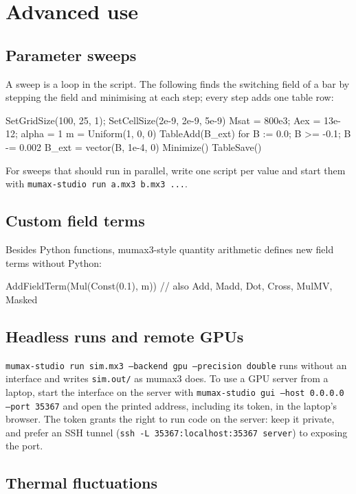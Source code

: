 \documentclass[11pt,a4paper,oneside]{book}
\newcommand{\code}[1]{\texttt{#1}}
\renewcommand{\_}{\textunderscore\allowbreak}
\begin{document}
\chapter{Advanced use}\label{ch:advanced}

\section{Parameter sweeps}

A sweep is a loop in the script. The following finds the switching field of a bar by stepping the field and
minimising at each step; every step adds one table row:
\begin{mxcode}
SetGridSize(100, 25, 1); SetCellSize(2e-9, 2e-9, 5e-9)
Msat = 800e3; Aex = 13e-12; alpha = 1
m = Uniform(1, 0, 0)
TableAdd(B_ext)
for B := 0.0; B >= -0.1; B -= 0.002 {
    B_ext = vector(B, 1e-4, 0)
    Minimize()
    TableSave()
}
\end{mxcode}
For sweeps that should run in parallel, write one script per value and start them with
\code{mumax-studio run a.mx3 b.mx3 ...}.

\section{Custom field terms}

Besides Python functions, mumax3-style quantity arithmetic defines new field terms without Python:
\begin{mxcode}
AddFieldTerm(Mul(Const(0.1), m))        // also Add, Madd, Dot, Cross, MulMV, Masked
\end{mxcode}

\section{Headless runs and remote GPUs}

\code{mumax-studio run sim.mx3 --backend gpu --precision double} runs without an interface and writes
\code{sim.out/} as mumax3 does. To use a GPU server from a laptop, start the interface on the server with
\code{mumax-studio gui --host 0.0.0.0 --port 35367} and open the printed address, including its token, in the
laptop's browser. The token grants the right to run code on the server: keep it private, and prefer an SSH tunnel
(\code{ssh -L 35367:localhost:35367 server}) to exposing the port.

\section{Thermal fluctuations}
\end{document}
